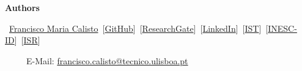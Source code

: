 \documentclass{tufte-book} %
\begin{document}
\textbf{Authors}

\hfill

\textemdash~\href{http://franciscocalisto.me/}{Francisco Maria Calisto}~[\href{https://github.com/FMCalisto}{GitHub}]~[\href{https://www.researchgate.net/profile/Francisco_Maria_Calisto}{ResearchGate}]~[\href{https://www.linkedin.com/in/fmcalisto/}{LinkedIn}]~[\href{http://web.tecnico.ulisboa.pt/francisco.calisto/}{IST}]~[\href{http://www.inesc-id.pt/member/15650/}{INESC-ID}]~[\href{http://welcome.isr.tecnico.ulisboa.pt/author/franciscomariagalambaferraricalisto/}{ISR}]

~~~~~E-Mail: \href{mailto:francisco.calisto@tecnico.ulisboa.pt}{francisco.calisto@tecnico.ulisboa.pt}

\hfill


\begin{figure}[htp]
\centering
{}%
%
%
%
%
%
\end{figure}


\end{document}
